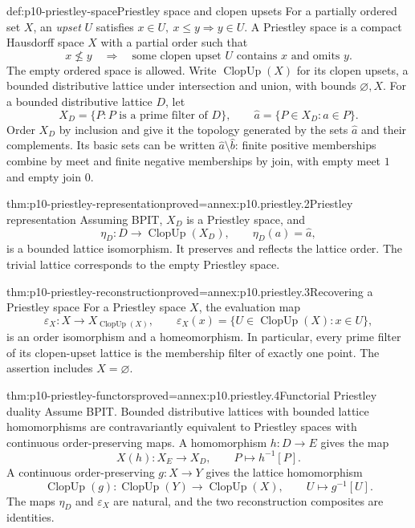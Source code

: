 \begin{hbdefinition}{def:p10-priestley-space}{Priestley space and clopen upsets}
For a partially ordered set \(X\), an \emph{upset} \(U\) satisfies
\(x\in U,\ x\leq y\Rightarrow y\in U\).
A Priestley space is a compact Hausdorff space \(X\) with a partial
order such that
\[
 x\not\leq y\quad\Longrightarrow\quad
 \text{some clopen upset }U\text{ contains }x\text{ and omits }y.
\]
The empty ordered space is allowed.
Write \(\operatorname{ClopUp}(X)\) for its clopen upsets, a bounded
distributive lattice under intersection and union, with bounds
\(\varnothing,X\).
For a bounded distributive lattice \(D\), let
\[
 X_D=\{P:P\text{ is a prime filter of }D\},\qquad
 \widehat a=\{P\in X_D:a\in P\}.
\]
Order \(X_D\) by inclusion and give it the topology generated by
the sets \(\widehat a\) and their complements.
Its basic sets can be written
\(\widehat a\setminus\widehat b\):
finite positive memberships combine by meet and finite negative
memberships by join, with empty meet \(1\) and empty join \(0\).
\end{hbdefinition}

\begin{hbtheorem}{thm:p10-priestley-representation}{proved=annex:p10.priestley.2}{Priestley representation}
Assuming BPIT, \(X_D\) is a Priestley space, and
\[
 \eta_D:D\longrightarrow\operatorname{ClopUp}(X_D),
 \qquad \eta_D(a)=\widehat a,
\]
is a bounded lattice isomorphism.
It preserves and reflects the lattice order.
The trivial lattice corresponds to the empty Priestley space.
\end{hbtheorem}

\begin{hbtheorem}{thm:p10-priestley-reconstruction}{proved=annex:p10.priestley.3}{Recovering a Priestley space}
For a Priestley space \(X\), the evaluation map
\[
 \varepsilon_X:X\longrightarrow
      X_{\operatorname{ClopUp}(X)},\qquad
 \varepsilon_X(x)=\{U\in\operatorname{ClopUp}(X):x\in U\},
\]
is an order isomorphism and a homeomorphism.
In particular, every prime filter of its clopen-upset lattice
is the membership filter of exactly one point.
The assertion includes \(X=\varnothing\).
\end{hbtheorem}

\begin{hbtheorem}{thm:p10-priestley-functors}{proved=annex:p10.priestley.4}{Functorial Priestley duality}
Assume BPIT.
Bounded distributive lattices with bounded lattice homomorphisms
are contravariantly equivalent to Priestley spaces with continuous
order-preserving maps.
A homomorphism \(h:D\to E\) gives the map
\[
 X(h):X_E\to X_D,\qquad P\mapsto h^{-1}[P].
\]
A continuous order-preserving \(g:X\to Y\) gives the lattice
homomorphism
\[
 \operatorname{ClopUp}(g):
 \operatorname{ClopUp}(Y)\to\operatorname{ClopUp}(X),
 \qquad U\mapsto g^{-1}[U].
\]
The maps \(\eta_D\) and \(\varepsilon_X\) are natural, and the
two reconstruction composites are identities.
\end{hbtheorem}

